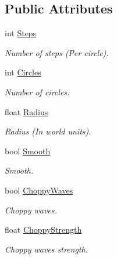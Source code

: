 \subsection*{Public Attributes}
\begin{CompactItemize}
\item 
int \hyperlink{struct_hydrax_1_1_module_1_1_radial_grid_1_1_options_902da4f0f8dfa6f9e47e48a7af346e2b}{Steps}
\begin{CompactList}\small\item\em Number of steps (Per circle). \item\end{CompactList}\item 
int \hyperlink{struct_hydrax_1_1_module_1_1_radial_grid_1_1_options_efe98acc6ec2bfcbd0776ec43343819e}{Circles}
\begin{CompactList}\small\item\em Number of circles. \item\end{CompactList}\item 
float \hyperlink{struct_hydrax_1_1_module_1_1_radial_grid_1_1_options_2ebdfa6131bc283e2cc3ec8d74a3d712}{Radius}
\begin{CompactList}\small\item\em Radius (In world units). \item\end{CompactList}\item 
bool \hyperlink{struct_hydrax_1_1_module_1_1_radial_grid_1_1_options_1004e40adf66a0c305bb6cb4ca46d4a6}{Smooth}
\begin{CompactList}\small\item\em Smooth. \item\end{CompactList}\item 
bool \hyperlink{struct_hydrax_1_1_module_1_1_radial_grid_1_1_options_8f2d48d2bc30eaa1862696aadacd9241}{ChoppyWaves}
\begin{CompactList}\small\item\em Choppy waves. \item\end{CompactList}\item 
float \hyperlink{struct_hydrax_1_1_module_1_1_radial_grid_1_1_options_bc3d5ce9e689f4ae7eacf517c25a7c78}{ChoppyStrength}
\begin{CompactList}\small\item\em Choppy waves strength. \item\end{CompactList}\item 

\end{CompactItemize}
